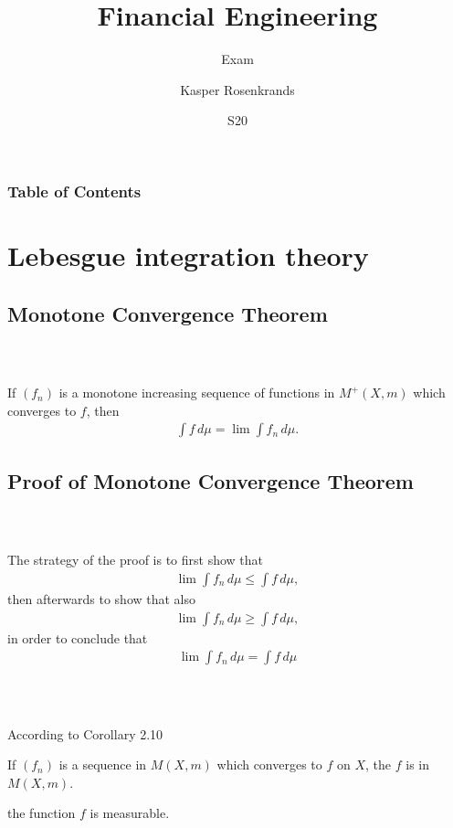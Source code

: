 \documentclass{beamer}
\title{Financial Engineering}
\subtitle{Exam}
\author{Kasper Rosenkrands}
\institute{Aalborg University}
\date{S20}
\numberwithin{equation}{section}
\begin{document}
\frame{\titlepage}

\begin{frame}
\frametitle{Table of Contents}
\tableofcontents[hideallsubsections]
\end{frame}

\section{Lebesgue integration theory}

\subsection{Monotone Convergence Theorem}

\begin{frame}\frametitle{{\normalsize \secname} \\ {\large \subsecname}}
    \begin{theorem}
        If $(f_n)$ is a monotone increasing sequence of functions in $M^+(X,m)$ which converges to $f$, then
        \begin{align}\label{eq:b4.6}
            \int f \,d\mu = \lim \int f_n  \,d\mu. 
        \end{align}
    \end{theorem}
\end{frame}

\subsection{Proof of Monotone Convergence Theorem}

\begin{frame}\frametitle{{\normalsize \secname} \\ {\large \subsecname}}
    The strategy of the proof is to first show that
    \begin{align}
        \lim \int f_n \, d\mu \leq \int f \, d\mu,
    \end{align}
    then afterwards to show that also
    \begin{align}
        \lim \int f_n \, d\mu \geq \int f \, d\mu,
    \end{align}
    in order to conclude that
    \begin{align}
        \lim \int f_n \, d\mu = \int f \, d\mu
    \end{align}
\end{frame}

\begin{frame}\frametitle{{\normalsize \secname} \\ {\large \subsecname}}
    According to Corollary 2.10
    \begin{corollary}[2.10]
        If $(f_n)$ is a sequence in $M(X,m)$ which converges to $f$ on $X$, the $f$ is in $M(X,m)$.
    \end{corollary}
    the function $f$ is measurable.
\end{frame}
\end{document}
